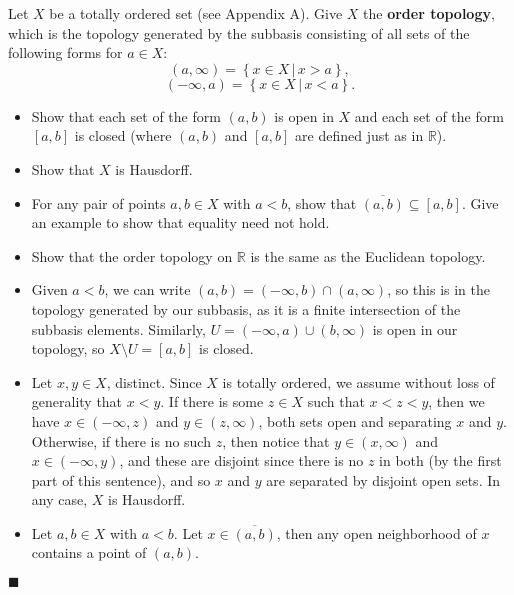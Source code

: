 \documentclass[12pt]{article}
\renewcommand{\qed}{\hfill$\blacksquare$}
\renewenvironment{proof}{\begin{addmargin}[1em]{0em}\begin{newproof}}{\end{newproof}\end{addmargin}\qed}
\newenvironment{problem}[2][Problem]{\begin{trivlist}
\item[\hskip \labelsep {\bfseries #1}\hskip \labelsep {\bfseries #2.}]}{\end{trivlist}}
\begin{document}
\begin{problem}{2-13}
Let $X$ be a totally ordered set (see Appendix A). Give $X$ the \textbf{order topology}, which is the topology generated by the subbasis consisting of all sets of the following forms for $a\in X$:
$$ \left(a,\infty\right) = \left\{x\in X \, | \, x>a\right\}, $$
$$ \left(-\infty,a\right) = \left\{x\in X\, | \, x<a\right\}.$$
\begin{itemize}
	\item Show that each set of the form $\left(a,b\right)$ is open in $X$ and each set of the form $\left[a,b\right]$ is closed (where $\left(a,b\right)$ and $\left[a,b\right]$ are defined just as in $\mathbb{R}$).
	\item Show that $X$ is Hausdorff.
	\item For any pair of points $a,b\in X$ with $a<b$, show that $\overline{\left(a,b\right)} \subseteq \left[a,b\right]$. Give an example to show that equality need not hold.
	\item Show that the order topology on $\mathbb{R}$ is the same as the Euclidean topology.
\end{itemize}
\end{problem}
\begin{proof}
\begin{itemize}
	\item Given $a<b$, we can write $\left(a,b\right) = \left(-\infty,b\right)\cap\left(a,\infty\right)$, so this is in the topology generated by our subbasis, as it is a finite intersection of the subbasis elements. Similarly, $U = \left(-\infty,a\right)\cup\left(b,\infty\right)$ is open in our topology, so $X\setminus U = \left[a,b\right]$ is closed.
	\item Let $x,y\in X$, distinct. Since $X$ is totally ordered, we assume without loss of generality that $x < y$. If there is some $z\in X$ such that $x < z < y$, then we have $x \in \left(-\infty,z\right)$ and $y \in \left(z,\infty\right)$, both sets open and separating $x$ and $y$. Otherwise, if there is no such $z$, then notice that $y \in \left(x,\infty\right)$ and $x \in \left(-\infty,y\right)$, and these are disjoint since there is no $z$ in both (by the first part of this sentence), and so $x$ and $y$ are separated by disjoint open sets. In any case, $X$ is Hausdorff.
	\item Let $a,b\in X$ with $a< b$. Let $x \in \overline{\left(a,b\right)}$, then any open neighborhood of $x$ contains a point of $\left(a,b\right)$. 
\end{itemize}
\end{proof}
\end{document}
